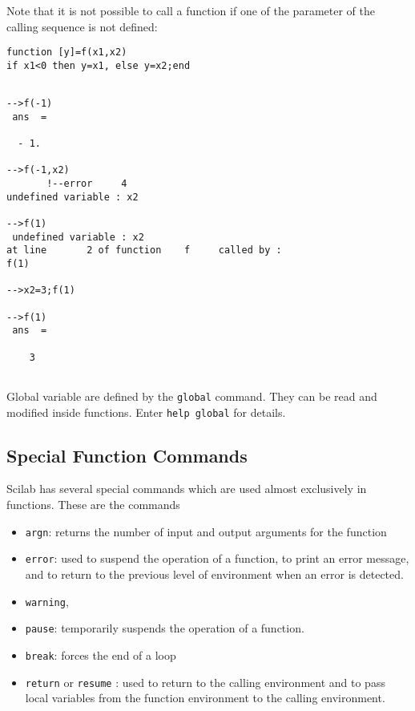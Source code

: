 Note that it is not possible to call a function if one of the
parameter of the calling sequence is not defined:

\begin{verbatim}
function [y]=f(x1,x2)
if x1<0 then y=x1, else y=x2;end

\end{verbatim}
\begin{verbatim}

-->f(-1)
 ans  =
 
  - 1.  
 
-->f(-1,x2)
       !--error     4 
undefined variable : x2  

-->f(1)
 undefined variable : x2                      
at line       2 of function    f     called by :  
f(1)

-->x2=3;f(1)

-->f(1)
 ans  =
 
    3
                    
\end{verbatim}

Global variable are defined by the \verb!global! command. They can
be read and modified inside functions. Enter {\tt help global} for
details. 

\subsection{Special Function Commands}
Scilab has several special commands which are used almost exclusively
in functions.  These are the commands 

\begin{itemize}
	\item {\tt argn}: returns the number of input
and output arguments for the function
	\item {\tt error}: used to suspend the 
operation of a function, to print an error message, and to return to the
previous level of environment when an error is detected.  
	\item {\tt warning}, 
	\item {\tt pause}: temporarily suspends the 
operation of a function.
	\item {\tt break}: forces the end of a loop 
	\item {\tt return} or {\tt resume} : used 
to return to the calling environment and to pass local
variables from the function environment to the calling environment.  
\end{itemize}

